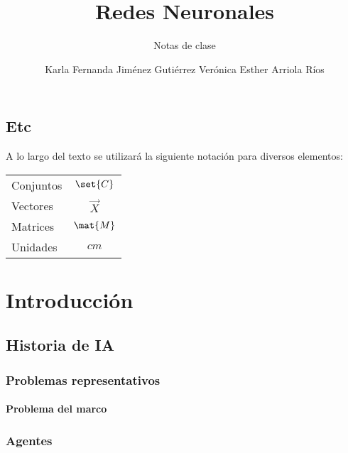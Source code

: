 \documentclass[12pt,openany]{book}
\title{Redes Neuronales}
\subtitle{Notas de clase}
\author{Karla Fernanda Jiménez Gutiérrez\newline
        Verónica Esther Arriola Ríos}
\begin{document}
\maketitle

\frontmatter %
\tableofcontents
\clearemptydoublepage %


\mainmatter  %


\chapter*{Etc}

A lo largo del texto se utilizará la siguiente notación para diversos elementos:
\begin{longtable}{lc}
 Conjuntos   &   $\set{C}$ \\
 Vectores    &   $\vec{X}$ \\
 Matrices    &   $\mat{M}$ \\
 Unidades    &   $\unit{cm}$
\end{longtable}



\part{Introducción}
\chapter{Historia de IA}
\section{Problemas representativos}
\subsection{Problema del marco}

\section{Agentes}
\end{document}
